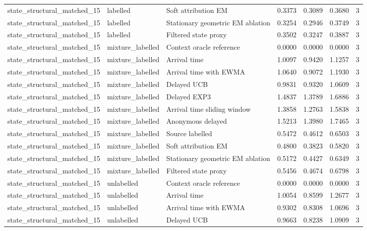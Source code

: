 \begin{tabular}{llllllr}
state\_structural\_matched\_15 & labelled & Soft attribution EM & 0.3373 & 0.3089 & 0.3680 & 3 \\
state\_structural\_matched\_15 & labelled & Stationary geometric EM ablation & 0.3254 & 0.2946 & 0.3749 & 3 \\
state\_structural\_matched\_15 & labelled & Filtered state proxy & 0.3502 & 0.3247 & 0.3887 & 3 \\
state\_structural\_matched\_15 & mixture\_labelled & Context oracle reference & 0.0000 & 0.0000 & 0.0000 & 3 \\
state\_structural\_matched\_15 & mixture\_labelled & Arrival time & 1.0097 & 0.9420 & 1.1257 & 3 \\
state\_structural\_matched\_15 & mixture\_labelled & Arrival time with EWMA & 1.0640 & 0.9072 & 1.1930 & 3 \\
state\_structural\_matched\_15 & mixture\_labelled & Delayed UCB & 0.9831 & 0.9320 & 1.0609 & 3 \\
state\_structural\_matched\_15 & mixture\_labelled & Delayed EXP3 & 1.4837 & 1.3789 & 1.6886 & 3 \\
state\_structural\_matched\_15 & mixture\_labelled & Arrival time sliding window & 1.3858 & 1.2763 & 1.5838 & 3 \\
state\_structural\_matched\_15 & mixture\_labelled & Anonymous delayed & 1.5213 & 1.3980 & 1.7465 & 3 \\
state\_structural\_matched\_15 & mixture\_labelled & Source labelled & 0.5472 & 0.4612 & 0.6503 & 3 \\
state\_structural\_matched\_15 & mixture\_labelled & Soft attribution EM & 0.4800 & 0.3823 & 0.5820 & 3 \\
state\_structural\_matched\_15 & mixture\_labelled & Stationary geometric EM ablation & 0.5172 & 0.4427 & 0.6349 & 3 \\
state\_structural\_matched\_15 & mixture\_labelled & Filtered state proxy & 0.5456 & 0.4674 & 0.6798 & 3 \\
state\_structural\_matched\_15 & unlabelled & Context oracle reference & 0.0000 & 0.0000 & 0.0000 & 3 \\
state\_structural\_matched\_15 & unlabelled & Arrival time & 1.0054 & 0.8599 & 1.2677 & 3 \\
state\_structural\_matched\_15 & unlabelled & Arrival time with EWMA & 0.9302 & 0.8308 & 1.0696 & 3 \\
state\_structural\_matched\_15 & unlabelled & Delayed UCB & 0.9663 & 0.8238 & 1.0909 & 3 \\

\end{tabular}
